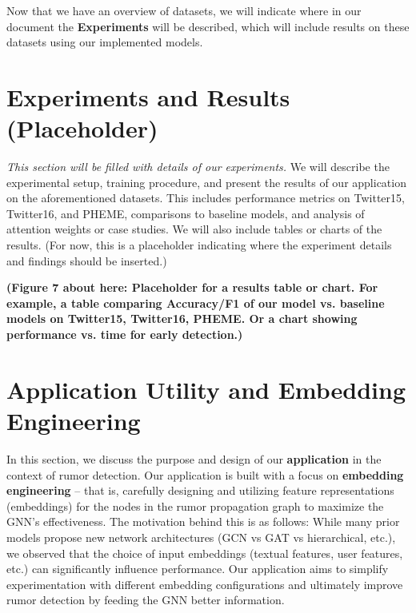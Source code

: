 \documentclass[12pt,a4paper]{report}
\begin{document}
Now that we have an overview of datasets, we will indicate where in our document the \textbf{Experiments} will be described, which will include results on these datasets using our implemented models.

\chapter{Experiments and Results (Placeholder)}

\textit{This section will be filled with details of our experiments.} We will describe the experimental setup, training procedure, and present the results of our application on the aforementioned datasets. This includes performance metrics on Twitter15, Twitter16, and PHEME, comparisons to baseline models, and analysis of attention weights or case studies. We will also include tables or charts of the results. (For now, this is a placeholder indicating where the experiment details and findings should be inserted.)

\textbf{(Figure 7 about here: Placeholder for a results table or chart. For example, a table comparing Accuracy/F1 of our model vs. baseline models on Twitter15, Twitter16, PHEME. Or a chart showing performance vs. time for early detection.)}

\chapter{Application Utility and Embedding Engineering}

In this section, we discuss the purpose and design of our \textbf{application} in the context of rumor detection. Our application is built with a focus on \textbf{embedding engineering} – that is, carefully designing and utilizing feature representations (embeddings) for the nodes in the rumor propagation graph to maximize the GNN’s effectiveness. The motivation behind this is as follows: While many prior models propose new network architectures (GCN vs GAT vs hierarchical, etc.), we observed that the choice of input embeddings (textual features, user features, etc.) can significantly influence performance. Our application aims to simplify experimentation with different embedding configurations and ultimately improve rumor detection by feeding the GNN better information.
\end{document}
